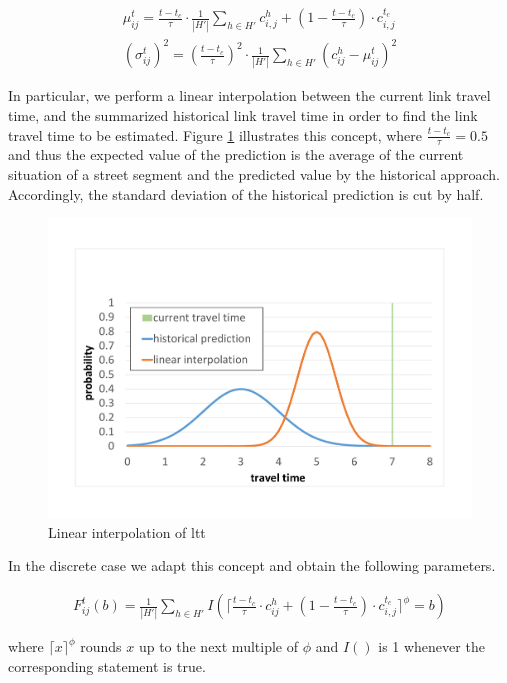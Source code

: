 \begin{gather}
	\mu_{ij}^t = \frac{t - t_c}{\tau}\cdot\frac{1}{|H'|}\sum_{h\in H'} c_{i,j}^h
	+ (1-\frac{t - t_c}{\tau})\cdot c_{i,j}^{t_c}\\
	(\sigma_{ij}^t)^2 = (\frac{t - t_c}{\tau})^2 \cdot \frac{1}{|H'|}\sum_{h\in H'}
	(c_{ij}^h-\mu_{ij}^t)^2
\end{gather}

In particular, we perform a linear interpolation between the current link
travel time, and the summarized historical link travel time in order to find the
link travel time to be estimated. Figure \ref{fig:interpolation} illustrates
this concept, where  $\frac{t - t_c}{\tau} = 0.5$ and thus the expected value of
the prediction is the average of the current situation of a street segment and
the predicted value by the historical approach. Accordingly, the standard
deviation of the historical prediction is cut by half.

 \begin{figure}[h]
    \centering
    \includegraphics[width=0.80\columnwidth]{figures/tt_interpolation.pdf}
    \caption{Linear interpolation of ltt}
    \label{fig:interpolation}
\end{figure}

In the discrete case we adapt this concept and
obtain the following parameters.

\begin{gather}
F_{ij}^t(b) = \frac{1}{|H'|}\sum_{h\in H'} I(\lceil\frac{t - t_c}{\tau} \cdot 
c_{ij}^h + (1-\frac{t - t_c}{\tau})\cdot c_{i,j}^{t_c}\rceil^\phi = b)
\end{gather}

where $\lceil x \rceil^\phi$ rounds $x$ up to the next multiple of $\phi$ and
$I()$ is 1 whenever the corresponding statement is true.

